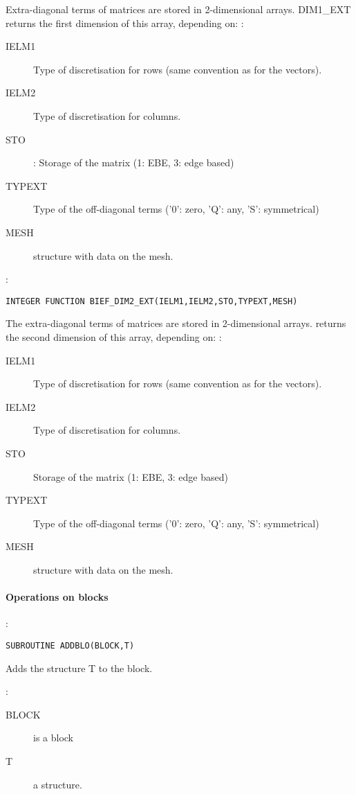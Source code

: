 Extra-diagonal terms of matrices are stored in 2-dimensional arrays.
DIM1\_EXT returns the first dimension of this array, depending on:
:
\begin{description}
  \item [IELM1] Type of discretisation for rows (same convention as for the
    vectors).
  \item [IELM2] Type of discretisation for columns.
  \item [STO]: Storage of the matrix (1: EBE, 3: edge based)
  \item [TYPEXT] Type of the off-diagonal terms ('0': zero, 'Q': any, 'S':
    symmetrical)
  \item [MESH]  structure with data on the mesh.
\end{description}

:
\begin{lstlisting}[language=TelFortran]
INTEGER FUNCTION BIEF_DIM2_EXT(IELM1,IELM2,STO,TYPEXT,MESH)
\end{lstlisting}

The extra-diagonal terms of matrices are stored in 2-dimensional arrays.
 returns the second dimension of this array, depending on:
:
\begin{description}
  \item [IELM1] Type of discretisation for rows (same convention as for the
    vectors).
  \item [IELM2] Type of discretisation for columns.
  \item [STO] Storage of the matrix (1: EBE, 3: edge based)
  \item [TYPEXT] Type of the off-diagonal terms ('0': zero, 'Q': any, 'S':
    symmetrical)
  \item [MESH]  structure with data on the mesh.
\end{description}

\paragraph{Operations on blocks}

:
\begin{lstlisting}[language=TelFortran]
SUBROUTINE ADDBLO(BLOCK,T)
\end{lstlisting}
Adds the structure T to the block.

:
\begin{description}
  \item [BLOCK] is a block
  \item [T] a structure.
\end{description}


